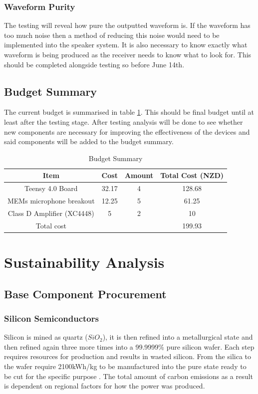\documentclass[12pt, a4paper]{article}
\begin{document}
\subsubsection{Waveform Purity}
The testing will reveal how pure the outputted waveform is. If the waveform has too much noise then a method of reducing this noise would need to be implemented into the speaker system. It is also necessary to know exactly what waveform is being produced as the receiver needs to know what to look for. This should be completed alongside testing so before June 14th. \\
\subsection{Budget Summary}
The current budget is summarised in table \ref{tab:budgetSummary}. This should be final budget until at least after the testing stage. After testing analysis will be done to see whether new components are necessary for improving the effectiveness of the devices and said components will be added to the budget summary. 
\begin{table} [!htb]
\begin{center}
	\caption{Budget Summary}
		\begin{tabular}{|c|c|c|c|}
			\hline
			Item & Cost & Amount & Total Cost (NZD) \\
			\hline
			Teensy 4.0 Board & 32.17 & 4 & 128.68 \\
			\hline
			MEMs microphone breakout & 12.25 & 5 & 61.25\\
			\hline
			Class D Amplifier (XC4448) & 5 & 2 & 10 \\
			\hline
			Total cost & & & 199.93\\
			\hline
		\end{tabular}
	
	\label{tab:budgetSummary}
\end{center}
\end{table}
\pagebreak
\section{Sustainability Analysis}
\subsection{Base Component Procurement}
\subsubsection{Silicon Semiconductors}
Silicon is mined as quartz ($SiO_2$), it is then refined into a metallurgical state and then refined again three more times into a 99.9999\% pure silicon wafer. Each step requires resources for production and results in wasted silicon. From the silica to the wafer require 2100kWh/kg to be manufactured into the pure state ready to be cut for the specific purpose \cite{siliconLCA}. The total amount of carbon emissions as a result is dependent on regional factors for how the power was produced.
\end{document}
